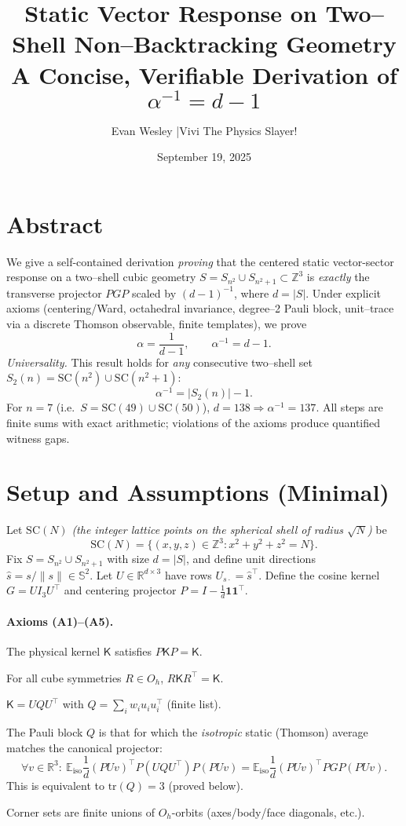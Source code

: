 \documentclass[11pt]{article}
\title{\Large Static Vector Response on Two–Shell Non–Backtracking Geometry\\[2pt]
\large A Concise, Verifiable Derivation of $\alpha^{-1}=d-1$}
\author{\normalsize Evan Wesley \quad|\quad Vivi The Physics Slayer!}
\date{\normalsize September 19, 2025}
\theoremstyle{definition}
\newcommand{\E}{\mathbb{E}}
\newcommand{\R}{\mathbb{R}}
\newcommand{\Sph}{\mathbb{S}}
\newcommand{\1}{\mathbf{1}}
\newcommand{\tr}{\mathrm{tr}}
\newcommand{\oh}{O_h}
\begin{document}
\maketitle

\section*{Abstract}
We give a self-contained derivation \emph{proving} that the centered static vector-sector response on a two–shell cubic geometry
\(
S=S_{n^2}\cup S_{n^2+1}\subset\mathbb{Z}^3
\)
is \emph{exactly} the transverse projector \(PGP\) scaled by \((d-1)^{-1}\), where \(d=|S|\).
Under explicit axioms (centering/Ward, octahedral invariance, degree–2 Pauli block, unit–trace via a discrete Thomson observable, finite templates), we prove
\[
\alpha=\frac{1}{d-1},\qquad \alpha^{-1}=d-1.
\]
\emph{Universality.} This result holds for \emph{any} consecutive two–shell set \(S_2(n)=\mathrm{SC}(n^2)\cup\mathrm{SC}(n^2\!+\!1)\):
\[
\alpha^{-1}=|S_2(n)|-1.
\]
For \(n=7\) (i.e.\ \(S=\mathrm{SC}(49)\cup\mathrm{SC}(50)\)), \(d=138\Rightarrow \alpha^{-1}=137\).
All steps are finite sums with exact arithmetic; violations of the axioms produce quantified witness gaps.

\section{Setup and Assumptions (Minimal)}
Let \(\mathrm{SC}(N)\) \emph{(the integer lattice points on the spherical shell of radius \(\sqrt{N}\))} be
\[
\mathrm{SC}(N)=\{(x,y,z)\in\mathbb{Z}^3:x^2+y^2+z^2=N\}.
\]
Fix \(S=S_{n^2}\cup S_{n^2+1}\) with size \(d=|S|\), and define unit directions \(\hat s=s/\|s\|\in\Sph^2\).
Let \(U\in\R^{d\times 3}\) have rows \(U_{s\cdot}=\hat s^\top\).
Define the cosine kernel \(G=U I_3 U^\top\) and centering projector \(P=I-\frac{1}{d}\1\1^\top\).

\paragraph{Axioms (A1)–(A5).}
\begin{description}[leftmargin=2.1em]
\item[(A1) Ward (centering)] The physical kernel \(\mathsf{K}\) satisfies \(P\mathsf{K}P=\mathsf{K}\).
\item[(A2) Octahedral invariance] For all cube symmetries \(R\in \oh\), \(R\mathsf{K}R^\top=\mathsf{K}\).
\item[(A3) Degree–2 (Pauli) construction] \(\mathsf{K}=U Q U^\top\) with \(Q=\sum_i w_i u_i u_i^\top\) (finite list).
\item[(A4) Unit–trace (UT) via observable] The Pauli block \(Q\) is that for which the \emph{isotropic} static (Thomson) average matches the canonical projector:
\[
\forall v\in\R^3:\ \E_{\mathrm{iso}}\frac{1}{d}(PUv)^\top P(UQU^\top)P(PUv)
= \E_{\mathrm{iso}}\frac{1}{d}(PUv)^\top PGP(PUv).
\]
This is equivalent to \(\tr(Q)=3\) (proved below).
\item[(A5) Finite $O_h$–closed templates] Corner sets are finite unions of \(O_h\)-orbits (axes/body/face diagonals, etc.).
\end{description}
\end{document}
